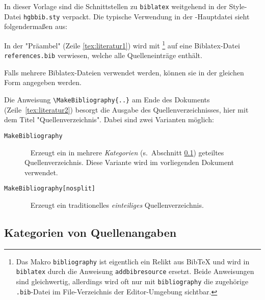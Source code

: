 In dieser Vorlage sind die Schnittstellen zu \texttt{biblatex} weitgehend in
der Style-Datei \nolinkurl{hgbbib.sty} verpackt. Die typische Verwendung in
der \latex-Haupt\-datei sieht folgendermaßen aus:
%
%
In der "Präambel" (Zeile \ref{tex:literatur1}) wird mit
\verb!!%
\footnote{Das Makro \texttt{{\bs}bibliography} ist eigentlich ein Relikt aus
BibTeX und wird in \texttt{biblatex} durch die Anweisung
\texttt{{\bs}addbibresource} ersetzt. Beide Anweisungen sind gleichwertig,
allerdings wird oft nur mit \texttt{{\bs}bibliography} die zugehörige
\texttt{.bib}-Datei im File-Verzeichnis der Editor-Umgebung sichtbar.}
auf eine Biblatex-Datei \nolinkurl{references.bib} verwiesen, welche alle
Quelleneinträge enthält.

Falls mehrere Biblatex-Dateien verwendet werden, können sie in der gleichen
Form angegeben werden.

Die Anweisung \verb!! am Ende des Dokuments
(Zeile~\ref{tex:literatur2}) besorgt die Ausgabe des Quellenverzeichnisses,
hier mit dem Titel "Quellenverzeichnis". Dabei sind zwei Varianten möglich:
%
\begin{description}
    \item[\texttt{{\bs}MakeBibliography}] ~ \newline
    Erzeugt ein in mehrere \emph{Kategorien} (s.\ Abschnitt
    \ref{sec:BibKategorien}) geteiltes Quellenverzeichnis. Diese
    Variante wird im vorliegenden Dokument verwendet.
%
    \item[\texttt{{\bs}MakeBibliography[nosplit]}] ~ \newline
    Erzeugt ein traditionelles \emph{einteiliges} Quellenverzeichnis.
\end{description}


\subsection{Kategorien von Quellenangaben}
\label{sec:BibKategorien}

